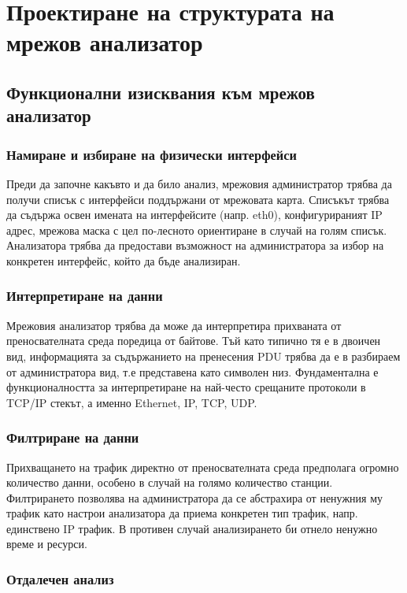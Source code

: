 \documentclass[12pt,a4paper,oneside]{book}
\begin{document}
\chapter{Проектиране на структурата на мрежов анализатор}

\section{Функционални изисквания към мрежов анализатор}

\subsection{Намиране и избиране на физически интерфейси}

Преди да започне какъвто и да било анализ, мрежовия администратор трябва да
получи списък с интерфейси поддържани от мрежовата карта. Списъкът трябва да
съдържа освен имената на интерфейсите (напр. eth0), конфигурираният IP адрес,
мрежова маска с цел по-лесното ориентиране в случай на голям списък.
Анализатора трябва да предостави възможност на администратора за избор на
конкретен интерфейс, който да бъде анализиран.

\subsection{Интерпретиране на данни}

Мрежовия анализатор трябва да може да интерпретира прихваната от преносвателната
среда поредица от байтове. Тъй като типично тя е в двоичен вид, информацията за
съдържанието на пренесения PDU трябва да е в разбираем от администратора вид,
т.е представена като символен низ. Фундаментална е функционалността за
интерпретиране на най-често срещаните протоколи в TCP/IP стекът, а именно
Ethernet, IP, TCP, UDP.

\subsection{Филтриране на данни}

Прихващането на трафик директно от преносвателната среда предполага огромно
количество данни, особено в случай на голямо количество станции. Филтрирането
позволява на администратора да се абстрахира от ненужния му трафик като настрои
анализатора да приема конкретен тип трафик, напр. единствено IP трафик. В
противен случай анализирането би отнело ненужно време и ресурси.

\subsection{Отдалечен анализ}
\end{document}
